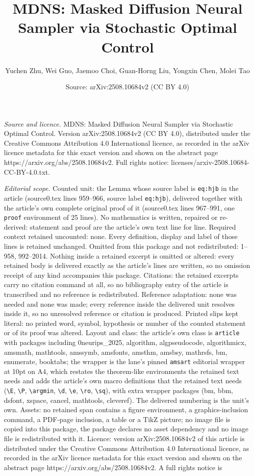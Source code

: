 \documentclass[10pt,a4paper]{amsart}
\title[MDNS: Masked Diffusion Neural Sampler via Stochastic Optimal]{MDNS: Masked Diffusion Neural Sampler via Stochastic Optimal Control}
\author{Yuchen Zhu, Wei Guo, Jaemoo Choi, Guan-Horng Liu, Yongxin Chen, Molei Tao}
\date{Source: arXiv:2508.10684v2 (CC BY 4.0)}
\begin{document}
\maketitle

\noindent\emph{Source and licence.} MDNS: Masked Diffusion Neural Sampler via Stochastic Optimal Control. Version arXiv:2508.10684v2 (CC BY 4.0), distributed under the Creative Commons Attribution 4.0 International licence, as recorded in the arXiv licence metadata for this exact version and shown on the abstract page https://arxiv.org/abs/2508.10684v2. Full rights notice: licenses/arxiv-2508.10684-CC-BY-4.0.txt.\par\smallskip

\noindent\textit{Editorial scope.} Counted unit: the Lemma whose source label is \texttt{eq:hjb} in the article (source0.tex lines 959--966, source label \texttt{eq:hjb}), delivered together with the article's own complete original proof of it (source0.tex lines 967--991, one \texttt{proof} environment of 25 lines). No mathematics is written, repaired or re-derived: statement and proof are the article's own text line for line. Required context retained uncounted: none. Every definition, display and label of those lines is retained unchanged. Omitted from this package and not redistributed: 1--958, 992--2014. Nothing inside a retained excerpt is omitted or altered: every retained body is delivered exactly as the article's lines are written, so no omission receipt of any kind accompanies this package. Citations: the retained excerpts carry no citation command at all, so no bibliography entry of the article is transcribed and no reference is redistributed. Reference adaptation: none was needed and none was made; every reference inside the delivered unit resolves inside it, so no unresolved reference or citation is produced. Printed slips kept literal: no printed word, symbol, hypothesis or number of the counted statement or of its proof was altered. Layout and class: the article's own class is \texttt{article} with packages including 0neurips\_2025, algorithm, algpseudocode, algorithmicx, amsmath, mathtools, amssymb, amsfonts, amsthm, amsbsy, mathrsfs, bm, enumerate, booktabs; the wrapper is the lane's pinned \texttt{amsart} editorial wrapper at 10pt on A4, which restates the theorem-like environments the retained text needs and adds the article's own macro definitions that the retained text needs (\texttt{\textbackslash E}, \texttt{\textbackslash P}, \texttt{\textbackslash argmin}, \texttt{\textbackslash d}, \texttt{\textbackslash e}, \texttt{\textbackslash ro}, \texttt{\textbackslash sq}), with extra wrapper packages (bm, bbm, dsfont, xspace, cancel, mathtools, cleveref). The delivered numbering is the unit's own. Assets: no retained span contains a figure environment, a graphics-inclusion command, a PDF-page inclusion, a table or a TikZ picture; no image file is copied into this package, the package declares no asset dependency and no image file is redistributed with it. Licence: version arXiv:2508.10684v2 of this article is distributed under the Creative Commons Attribution 4.0 International licence, as recorded in the arXiv licence metadata for this exact version and shown on the abstract page https://arxiv.org/abs/2508.10684v2. A full rights notice is 
\end{document}
